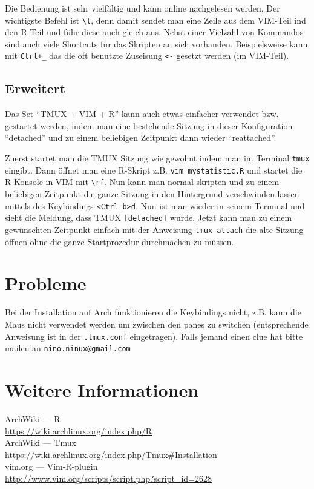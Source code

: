 \documentclass[a4paper,
               10pt,
               fleqn]{article}
\begin{document}
Die Bedienung ist sehr vielfältig und kann online nachgelesen werden.
Der wichtigste Befehl ist \verb!\l!, denn damit sendet man eine Zeile
aus dem VIM-Teil ind den R-Teil und führ diese auch gleich aus.
Nebst einer Vielzahl von Kommandos sind auch viele Shortcuts für das
Skripten an sich vorhanden. Beispielsweise kann mit \verb!Ctrl+_!
das die oft benutzte Zuseisung \verb!<-! gesetzt werden (im VIM-Teil).

\subsection{Erweitert}
Das Set ``TMUX + VIM + R'' kann auch etwas einfacher verwendet bzw.
gestartet werden, indem man eine bestehende Sitzung in dieser 
Konfiguration ``detached'' und zu einem beliebigen Zeitpunkt dann
wieder ``reattached''. 

Zuerst startet man die TMUX Sitzung wie gewohnt indem man im Terminal
\verb!tmux! eingibt. Dann öffnet man eine R-Skript z.B. 
\verb!vim mystatistic.R! und startet die R-Konsole in VIM mit
\verb!\rf!. Nun kann man normal skripten und zu einem beliebigen 
Zeitpunkt die ganze Sitzung in den Hintergrund verschwinden lassen
mittels des Keybindings \verb!<Ctrl-b>d!. Nun ist man wieder in seinem
Terminal und sieht die Meldung, dass TMUX \verb![detached]! wurde.
Jetzt kann man zu einem gewünschten Zeitpunkt einfach mit der Anweisung
\verb!tmux attach! die alte Sitzung öffnen ohne die ganze Startprozedur
durchmachen zu müssen.

\section{Probleme}
Bei der Installation auf Arch funktionieren die Keybindings nicht,
z.B. kann die Maus nicht verwendet werden um zwischen den panes zu 
switchen (entsprechende Anweisung ist in der \verb!.tmux.conf!
eingetragen). Falls jemand einen clue hat bitte mailen an
\verb!nino.ninux@gmail.com!

\section{Weitere Informationen}
ArchWiki --- R\\
\indent \url{https://wiki.archlinux.org/index.php/R}\\
ArchWiki --- Tmux\\
\indent \url{https://wiki.archlinux.org/index.php/Tmux#Installation}\\
vim.org --- Vim-R-plugin\\
\indent \url{http://www.vim.org/scripts/script.php?script_id=2628}
\end{document}
